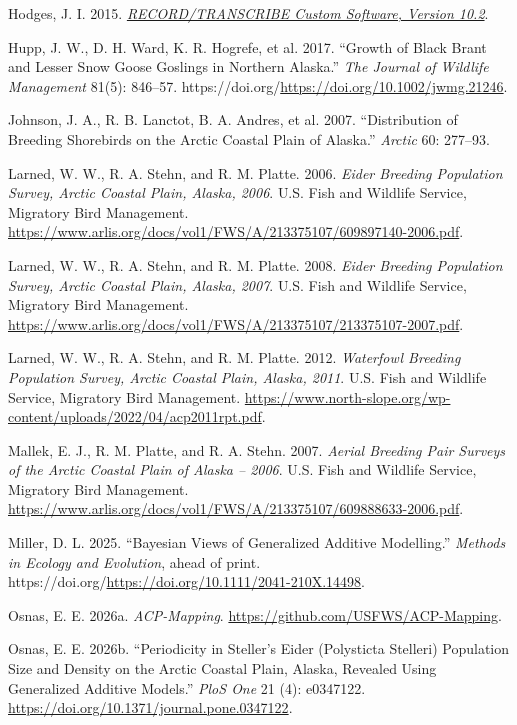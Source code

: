 \documentclass[
]{article}
\newlength{\cslhangindent}
\newenvironment{CSLReferences}[2] %
 {\begin{list}{}{%
  \setlength{\itemindent}{0pt}
  \setlength{\leftmargin}{0pt}
  \setlength{\parsep}{0pt}
  \ifodd #1
   \setlength{\leftmargin}{\cslhangindent}
   \setlength{\itemindent}{-1\cslhangindent}
  \fi
  \setlength{\itemsep}{#2\baselineskip}}}
 {\end{list}}
\begin{document}
\begin{CSLReferences}{1}{1}
Hodges, J. I. 2015. \emph{\href{}{RECORD/TRANSCRIBE Custom Software,
Version 10.2}}.

Hupp, J. W., D. H. Ward, K. R. Hogrefe, et al. 2017. {``Growth of Black
Brant and Lesser Snow Goose Goslings in Northern Alaska.''} \emph{The
Journal of Wildlife Management} 81(5): 846--57.
https://doi.org/\url{https://doi.org/10.1002/jwmg.21246}.

Johnson, J. A., R. B. Lanctot, B. A. Andres, et al. 2007.
{``Distribution of Breeding Shorebirds on the Arctic Coastal Plain of
Alaska.''} \emph{Arctic} 60: 277--93.

Larned, W. W., R. A. Stehn, and R. M. Platte. 2006. \emph{Eider Breeding
Population Survey, Arctic Coastal Plain, Alaska, 2006}. {U.S. Fish and
Wildlife Service}, {Migratory Bird Management}.
\url{https://www.arlis.org/docs/vol1/FWS/A/213375107/609897140-2006.pdf}.

Larned, W. W., R. A. Stehn, and R. M. Platte. 2008. \emph{Eider Breeding
Population Survey, Arctic Coastal Plain, Alaska, 2007}. {U.S. Fish and
Wildlife Service}, {Migratory Bird Management}.
\url{https://www.arlis.org/docs/vol1/FWS/A/213375107/213375107-2007.pdf}.

Larned, W. W., R. A. Stehn, and R. M. Platte. 2012. \emph{Waterfowl
Breeding Population Survey, Arctic Coastal Plain, Alaska, 2011}. {U.S.
Fish and Wildlife Service}, {Migratory Bird Management}.
\url{https://www.north-slope.org/wp-content/uploads/2022/04/acp2011rpt.pdf}.

Mallek, E. J., R. M. Platte, and R. A. Stehn. 2007. \emph{Aerial
Breeding Pair Surveys of the Arctic Coastal Plain of Alaska -- 2006}.
{U.S. Fish and Wildlife Service}, {Migratory Bird Management}.
\url{https://www.arlis.org/docs/vol1/FWS/A/213375107/609888633-2006.pdf}.

Miller, D. L. 2025. {``Bayesian Views of Generalized Additive
Modelling.''} \emph{Methods in Ecology and Evolution}, ahead of print.
https://doi.org/\url{https://doi.org/10.1111/2041-210X.14498}.

Osnas, E. E. 2026a. \emph{ACP-Mapping}.
\url{https://github.com/USFWS/ACP-Mapping}.

Osnas, E. E. 2026b. {``Periodicity in Steller's Eider (Polysticta
Stelleri) Population Size and Density on the Arctic Coastal Plain,
Alaska, Revealed Using Generalized Additive Models.''} \emph{PloS One}
21 (4): e0347122. \url{https://doi.org/10.1371/journal.pone.0347122}.


\end{CSLReferences}
\end{document}

